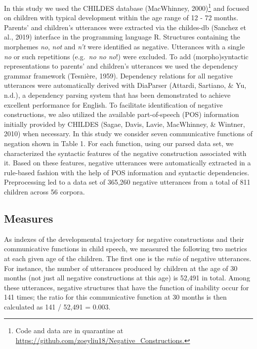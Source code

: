\documentclass[10pt, letterpaper]{article}
\begin{document}
In this study we used the CHILDES database (MacWhinney,
2000)\footnote{Code and data are in quarantine at \url{https://github.com/zoeyliu18/Negative_Constructions.}}
and focused on children with typical development within the age range of
12 - 72 months. Parents' and children's utterances were extracted via
the childes-db (Sanchez et al., 2019) interface in the programming
language R. Structures containing the morphemes \emph{no}, \emph{not}
and \emph{n't} were identified as negative. Utterances with a single
\emph{no} or such repetitions (e.g.~\emph{no no no}!) were excluded. To
add (morpho)syntactic representations to parents' and children's
utterances we used the dependency grammar framework (Tesnière, 1959).
Dependency relations for all negative utterances were automatically
derived with DiaParser (Attardi, Sartiano, \& Yu, n.d.), a dependency
parsing system that has been demonstrated to achieve excellent
performance for English. To facilitate identification of negative
constructions, we also utilized the available part-of-speech (POS)
information initially provided by CHILDES (Sagae, Davis, Lavie,
MacWhinney, \& Wintner, 2010) when necessary. In this study we consider
seven communicative functions of negation shown in Table 1. For each
function, using our parsed data set, we characterized the syntactic
features of the negative construction associated with it. Based on these
features, negative utterances were automatically extracted in a
rule-based fashion with the help of POS information and syntactic
dependencies. Preprocessing led to a data set of 365,260 negative
utterances from a total of 811 children across 56 corpora.

\hypertarget{measures}{%
\subsection{Measures}\label{measures}}

As indexes of the developmental trajectory for negative constructions
and their communicative functions in child speech, we measured the
following two metrics at each given age of the children. The first one
is the \emph{ratio} of negative utterances. For instance, the number of
utterances produced by children at the age of 30 months (not just all
negative constructions at this age) is 52,491 in total. Among these
utterances, negative structures that have the function of inability
occur for 141 times; the ratio for this communicative function at 30
months is then calculated as 141 / 52,491 = 0.003.
\end{document}
